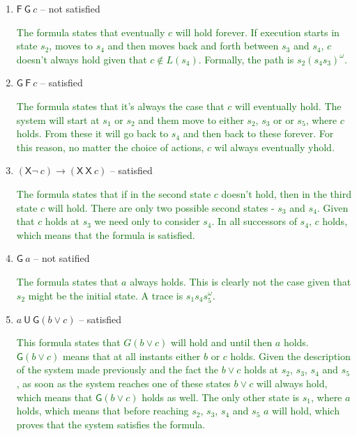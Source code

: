 \documentclass[12pt]{article}
\newcommand{\drafter}[1]{\textcolor{darkgreen}{#1}}
\begin{document}
\begin{enumerate}[label=\roman*.]
  \item $\mathsf{F}~\mathsf{G}~c$ -- not satisfied

  \drafter{The formula states that eventually $c$ will hold forever.}
  \drafter{If execution starts in state $s_2$, moves to $s_4$ and then moves back and forth between $s_3$ and $s_4$, $c$ doesn't always hold given that $c \notin L(s_4)$.}
  \drafter{Formally, the path is $s_2 (s_4 s_3)^\omega$.}

  \item $\mathsf{G}~\mathsf{F}~c$ -- satisfied

  \drafter{The formula states that it's always the case that $c$ will eventually hold.}
  \drafter{The system will start at $s_1$ or $s_2$ and them move to either $s_2$, $s_3$ or or $s_5$, where $c$ holds.}
  \drafter{From these it will go back to $s_4$ and then back to these forever.}
  \drafter{For this reason, no matter the choice of actions, $c$ wil always eventually yhold.}

  \item $(\mathsf{X}\neg~c) \rightarrow (\mathsf{X}~\mathsf{X}~c)$ -- satisfied

  \drafter{The formula states that if in the second state $c$ doesn't hold, then in the third state $c$ will hold.}
  \drafter{There are only two possible second states - $s_3$ and $s_4$.}
  \drafter{Given that $c$ holds at $s_3$ we need only to consider $s_4$.}
  \drafter{In all successors of $s_4$, $c$ holds, which means that the formula is satisfied.}

  \item $\mathsf{G}~a$ -- not satified

  \drafter{The formula states that $a$ always holds.}
  \drafter{This is clearly not the case given that $s_2$ might be the initial state.}
  \drafter{A trace is $s_1 s_4 s_5^{\omega}$.}

  \item $a~\mathsf{U}~\mathsf{G}(b \vee c)$ -- satisfied

  \drafter{This formula states that $G(b \vee c)$ will hold and until then $a$ holds.}
  \drafter{$\mathsf{G}(b \vee c)$ means that at all instants either $b$ or $c$ holds.}
  \drafter{Given the description of the system made previously and the fact the $b \vee c$ holds at $s_2$, $s_3$, $s_4$ and $s_5$, as soon as the system reaches one of these states $b \vee c$ will always hold, which means that $\mathsf{G}(b \vee c)$ holds as well.}
  \drafter{The only other state is $s_1$, where $a$ holds, which means that before reaching $s_2$, $s_3$, $s_4$ and $s_5$ $a$ will hold, which proves that the system satisfies the formula.}


\end{enumerate}
\end{document}

